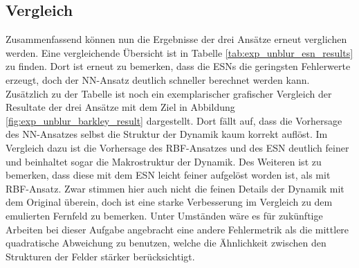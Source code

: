 \subsection{Vergleich}
Zusammenfassend können nun die Ergebnisse der drei Ansätze erneut verglichen werden. Eine vergleichende Übersicht ist in Tabelle \ref{tab:exp_unblur_esn_results} zu finden. Dort ist erneut zu bemerken, dass die \textsc{ESN}s die geringsten Fehlerwerte erzeugt, doch der \textsc{NN}-Ansatz deutlich schneller berechnet werden kann.\\
Zusätzlich zu der Tabelle ist noch ein exemplarischer grafischer Vergleich der Resultate der drei Ansätze mit dem Ziel in Abbildung \ref{fig:exp_unblur_barkley_result} dargestellt. Dort fällt auf, dass die Vorhersage des \textsc{NN}-Ansatzes selbst die Struktur der Dynamik kaum korrekt auflöst. Im Vergleich dazu ist die Vorhersage des \textsc{RBF}-Ansatzes und des \textsc{ESN} deutlich feiner und beinhaltet sogar die Makrostruktur der Dynamik. Des Weiteren ist zu bemerken, dass diese mit dem \textsc{ESN} leicht feiner aufgelöst worden ist, als mit \textsc{RBF}-Ansatz. Zwar stimmen hier auch nicht die feinen Details der Dynamik mit dem Original überein, doch ist eine starke Verbesserung im Vergleich zu dem emulierten Fernfeld zu bemerken. Unter Umständen wäre es für zukünftige Arbeiten bei dieser Aufgabe angebracht eine andere Fehlermetrik als die mittlere quadratische Abweichung zu benutzen, welche die Ähnlichkeit zwischen den Strukturen der Felder stärker berücksichtigt. 

